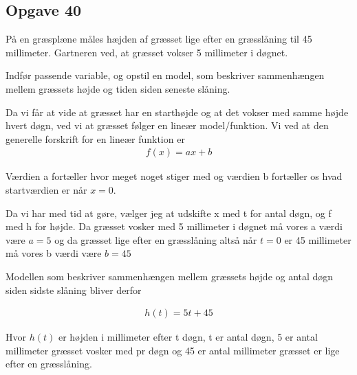 \subsection{Opgave 40}

På en græsplæne måles hæjden af græsset lige efter en græsslåning til 45 millimeter. Gartneren ved, at græsset vokser 5 millimeter i døgnet.

Indfør passende variable, og opstil en model, som beskriver sammenhængen mellem græssets højde og tiden siden seneste slåning.

\ans

Da vi får at vide at græsset har en starthøjde og at det vokser med samme højde hvert døgn, ved vi at 
græsset følger en lineær model/funktion. Vi ved at den generelle forskrift for en lineær funktion er 
\begin{align*}
    f(x) = ax + b
\end{align*}

Værdien a fortæller hvor meget noget stiger med og værdien b fortæller os hvad startværdien er når $x = 0$.

Da vi har med tid at gøre, vælger jeg at udskifte x med t for antal døgn, og f med h for højde. 
Da græsset vosker med 5 millimeter i døgnet må vores a værdi være $a = 5$ og da græsset lige efter en græsslåning altså når $t = 0$ er 45 millimeter må vores b værdi være $b = 45$

Modellen som beskriver sammenhængen mellem græssets højde og antal døgn siden sidste slåning bliver derfor

\begin{align*}
    h(t) = 5t + 45
\end{align*}

Hvor $h(t)$ er højden i millimeter efter t døgn, t er antal døgn, 5 er antal millimeter græsset vosker med pr døgn og 45 er antal millimeter græsset er lige efter en græsslåning.